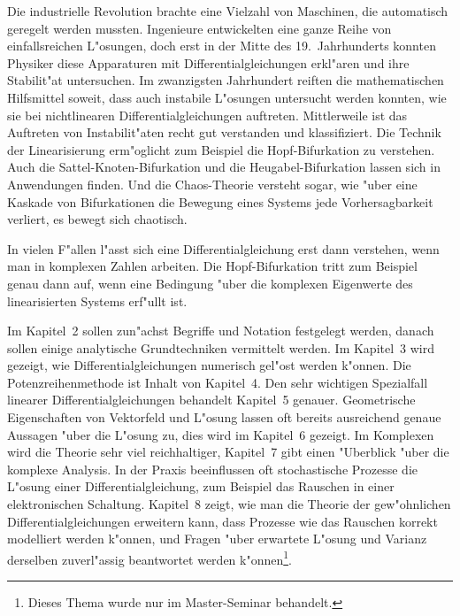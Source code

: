 Die industrielle Revolution brachte eine Vielzahl von Maschinen,
%
die automatisch geregelt werden mussten.
Ingenieure entwickelten eine ganze Reihe von einfallsreichen L"osungen,
doch erst in der Mitte des 19.~Jahrhunderts konnten Physiker diese
Apparaturen mit Differentialgleichungen erkl"aren und ihre Stabilit"at
untersuchen.
Im zwanzigsten Jahrhundert reiften die mathematischen Hilfsmittel
soweit, dass auch instabile L"osungen untersucht werden konnten,
wie sie bei nichtlinearen Differentialgleichungen auftreten.
Mittlerweile ist das Auftreten von Instabilit"aten recht gut verstanden
und klassifiziert. 
Die Technik der Linearisierung erm"oglicht zum Beispiel die
Hopf-Bifurkation zu verstehen.
%
%
Auch die Sattel-Knoten-Bifurkation und die Heugabel-Bifurkation
lassen sich in Anwendungen finden.
%
%
%
%
Und die Chaos-Theorie versteht sogar, wie "uber eine Kaskade von
Bifurkationen die Bewegung eines Systems jede Vorhersagbarkeit verliert,
es bewegt sich chaotisch.
%

In vielen F"allen l"asst sich eine Differentialgleichung erst dann
verstehen, wenn man in komplexen Zahlen arbeiten. 
Die Hopf-Bifurkation tritt zum Beispiel genau dann auf, wenn eine
Bedingung "uber die komplexen Eigenwerte des linearisierten Systems
erf"ullt ist.

Im Kapitel~2 sollen zun"achst Begriffe und Notation festgelegt werden,
danach sollen einige analytische Grundtechniken vermittelt werden.
Im Kapitel~3 wird gezeigt, wie Differentialgleichungen numerisch
gel"ost werden k"onnen.
Die Potenzreihenmethode ist Inhalt von Kapitel~4. 
Den sehr wichtigen Spezialfall linearer Differentialgleichungen
behandelt Kapitel~5 genauer.
Geometrische Eigenschaften von Vektorfeld und L"osung lassen oft
bereits ausreichend genaue Aussagen "uber die L"osung zu,  dies wird
im Kapitel~6 gezeigt.
Im Komplexen wird die Theorie sehr viel reichhaltiger, Kapitel~7 gibt
einen "Uberblick "uber die komplexe Analysis.
In der Praxis beeinflussen oft stochastische Prozesse die L"osung einer
Differentialgleichung, zum Beispiel das Rauschen in einer elektronischen
Schaltung.
Kapitel~8 zeigt, wie man die Theorie der gew"ohnlichen Differentialgleichungen
erweitern kann, dass Prozesse wie das Rauschen korrekt modelliert 
werden k"onnen, und Fragen "uber erwartete L"osung und Varianz
derselben zuverl"assig beantwortet werden k"onnen\footnote{Dieses Thema
wurde nur im Master-Seminar behandelt.}.


